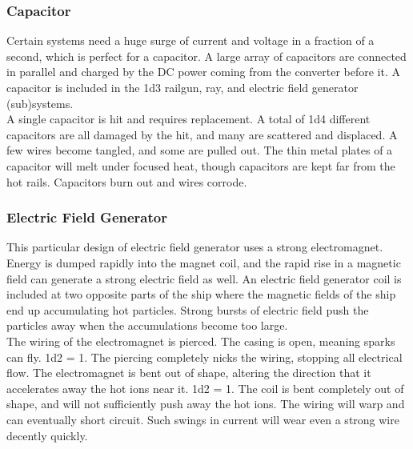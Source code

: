 \documentclass[a4paper]{article}
\begin{document}
\vspace{-0.5cm} \hspace{-18pt} \subsubsection{Capacitor} \label{grid_capacitor} \vspace{-0.2cm}
Certain systems need a huge surge of current and voltage in a fraction of a second, which is perfect for a capacitor. A large array of capacitors are connected in parallel and charged by the DC power coming from the converter before it. A capacitor is included in the 1d3 railgun, ray, and electric field generator (sub)systems.
\\ \pbhw
{A single capacitor is hit and requires replacement.}
{A total of 1d4 different capacitors are all damaged by the hit, and many are scattered and displaced. A few wires become tangled, and some are pulled out.}
{The thin metal plates of a capacitor will melt under focused heat, though capacitors are kept far from the hot rails.}
{Capacitors burn out and wires corrode.}


\vspace{-0.5cm} \hspace{-18pt} \subsubsection{Electric Field Generator} \label{grid_e_field_generator} \vspace{-0.2cm}
This particular design of electric field generator uses a strong electromagnet. Energy is dumped rapidly into the magnet coil, and the rapid rise in a magnetic field can generate a strong electric field as well. An electric field generator coil is included at two opposite parts of the ship where the magnetic fields of the ship end up accumulating hot particles. Strong bursts of electric field push the particles away when the accumulations become too large.
\\ \pbhw
{The wiring of the electromagnet is pierced. The casing is open, meaning sparks can fly. \newline 1d2 = 1. The piercing completely nicks the wiring, stopping all electrical flow.}
{The electromagnet is bent out of shape, altering the direction that it accelerates away the hot ions near it. \newline 1d2 = 1. The coil is bent completely out of shape, and will not sufficiently push away the hot ions.}
{The wiring will warp and can eventually short circuit.}
{Such swings in current will wear even a strong wire decently quickly. }
\end{document}

